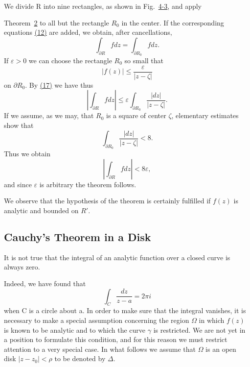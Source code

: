 We divide R into nine rectangles, as shown in Fig.~\hyperref[fig:4-3]{4-3}, and apply


Theorem~\hyperref[thm:4.2]{2} to all but the rectangle $R_{0}$ in the center. If the corresponding equations \hyperref[eq:4.12]{(12)} are added, we obtain, after cancellations,
\begin{equation*}
\int_ {\partial R} f d z = \int_ {\partial R _ {0}} f d z.\tag{17}\label{eq:4.17}
\end{equation*}
If $\varepsilon > 0$ we can choose the rectangle $R_0$ so small that
\begin{equation*}
| f (z) | \leq \frac {\varepsilon}{| z - \zeta |}
\end{equation*}
on $\partial R_0$. By \hyperref[eq:4.17]{(17)} we have thus
\begin{equation*}
\left| \int_ {\partial R} f d z \right| \leq \varepsilon \int_ {\partial R _ {0}} \frac {| d z |}{| z - \zeta |}.
\end{equation*}
If we assume, as we may, that $R_{0}$ is a square of center $\zeta$, elementary estimates show that
\begin{equation*}
\int_ {\partial R _ {0}} \frac {| d z |}{| z - \zeta |} <   8.
\end{equation*}
Thus we obtain
\begin{equation*}
\left| \int_ {\partial R} f d z \right| <   8 \varepsilon ,
\end{equation*}
and since $\varepsilon$ is arbitrary the theorem follows.

We observe that the hypothesis of the theorem is certainly fulfilled if $f(z)$ is analytic and bounded on $R'$.

\setcounter{section}{1}\setcounter{subsection}{4}\subsection{Cauchy's Theorem in a Disk}\label{sec:4.1.5}
It is not true that the integral of an analytic function over a closed curve is always zero.


Indeed, we have found that
\begin{equation*}
\int_ {C} \frac {d z}{z - a} = 2 \pi i
\end{equation*}
when C is a circle about a. In order to make sure that the integral vanishes, it is necessary to make a special assumption concerning the region $\Omega$ in which $f(z)$ is known to be analytic and to which the curve $\gamma$ is restricted. We are not yet in a position to formulate this condition, and for this reason we must restrict attention to a very special case. In what follows we assume that $\Omega$ is an open disk $|z - z_{0}| < \rho$ to be denoted by $\Delta$.

